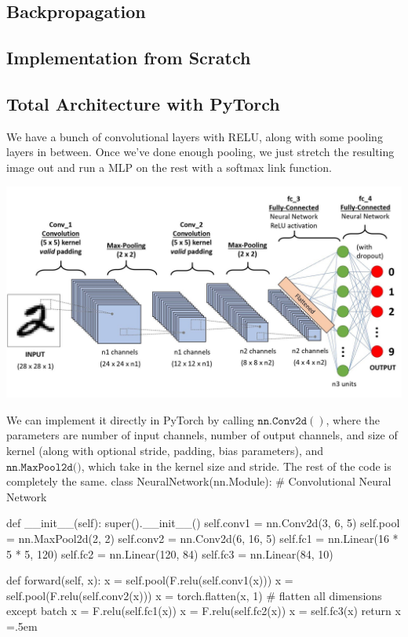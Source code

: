 \documentclass{article}
\newenvironment{cverbatim}
 {\SaveVerbatim{cverb}}
 {\endSaveVerbatim
  \flushleft\fboxrule=0pt\fboxsep=.5em
  \colorbox{cverbbg}{%
    \makebox[\dimexpr\linewidth-2\fboxsep][l]{\BUseVerbatim{cverb}}%
  }
  \endflushleft
}
\theoremstyle{definition}
\theoremstyle{remark}
\theoremstyle{definition}
\begin{document}
\subsection{Backpropagation}

\subsection{Implementation from Scratch}

\subsection{Total Architecture with PyTorch}

We have a bunch of convolutional layers with RELU, along with some pooling layers in between. Once we've done enough pooling, we just stretch the resulting image out and run a MLP on the rest with a softmax link function. 
\begin{center}
    \includegraphics[scale=0.25]{Images/CNNs/CNN_architecture.jpeg}
\end{center}

We can implement it directly in PyTorch by calling $\texttt{nn.Conv2d}()$, where the parameters are number of input channels, number of output channels, and size of kernel (along with optional stride, padding, bias parameters), and $\texttt{nn.MaxPool2d()}$, which take in the kernel size and stride. The rest of the code is completely the same. 
\begin{cverbatim}
class NeuralNetwork(nn.Module):
    # Convolutional Neural Network 

    def __init__(self):
        super().__init__()
        self.conv1 = nn.Conv2d(3, 6, 5)
        self.pool = nn.MaxPool2d(2, 2)
        self.conv2 = nn.Conv2d(6, 16, 5)
        self.fc1 = nn.Linear(16 * 5 * 5, 120)
        self.fc2 = nn.Linear(120, 84)
        self.fc3 = nn.Linear(84, 10)


    def forward(self, x):
        x = self.pool(F.relu(self.conv1(x)))
        x = self.pool(F.relu(self.conv2(x)))
        x = torch.flatten(x, 1) # flatten all dimensions except batch
        x = F.relu(self.fc1(x))
        x = F.relu(self.fc2(x))
        x = self.fc3(x)
        return x
\end{cverbatim}
\end{document}
